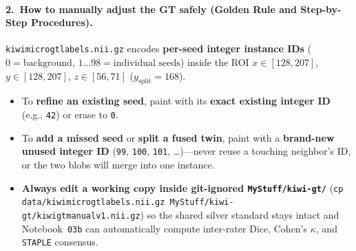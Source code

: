 \documentclass[10pt,a4paper]{article}
\renewcommand{\_}{\origunderscore\allowbreak}
\begin{document}
\paragraph{2.\ How to manually adjust the GT safely (Golden Rule and Step-by-Step Procedures).}
\begin{keybox}
\footnotesize
\texttt{kiwi\_micro\_gt\_labels.nii.gz} encodes \textbf{per-seed integer instance IDs} ($0 = \text{background}$, $1\dots 98 = \text{individual seeds}$) inside the ROI $x \in [128, 207]$, $y \in [128, 207]$, $z \in [56, 71]$ ($y_{\text{split}} = 168$).
\begin{itemize}[itemsep=1.5pt, topsep=2pt]
    \item To \textbf{refine an existing seed}, paint with its \textbf{exact existing integer ID} (e.g., \texttt{42}) or erase to \texttt{0}.
    \item To \textbf{add a missed seed} or \textbf{split a fused twin}, paint with a \textbf{brand-new unused integer ID} (\texttt{99}, \texttt{100}, \texttt{101}, \dots)---never reuse a touching neighbor's ID, or the two blobs will merge into one instance.
    \item \textbf{Always edit a working copy inside git-ignored \texttt{MyStuff/kiwi-gt/}} (\texttt{cp data/kiwi\_micro\_gt\_labels.nii.gz MyStuff/kiwi-gt/kiwi\_gt\_manual\_v1.nii.gz}) so the shared silver standard stays intact and Notebook~\texttt{03b} can automatically compute inter-rater Dice, Cohen's $\kappa$, and \texttt{STAPLE} consensus.
\end{itemize}
\end{keybox}
\end{document}
